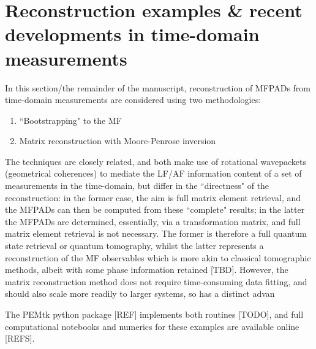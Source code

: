 \section{Reconstruction examples \& recent developments in time-domain measurements}

In this section/the remainder of the manuscript, reconstruction of MFPADs from time-domain measurements are considered using two methodologies:

\begin{enumerate}
\item ``Bootstrapping" to the MF \cite{hockett2018QMP1,hockett2018QMP2,marceau2017MolecularFrameReconstruction}
\item Matrix reconstruction with Moore-Penrose inversion \cite{gregory2021MolecularFramePhotoelectron}
\end{enumerate}

The techniques are closely related, and both make use of rotational wavepackets (geometrical coherences) to mediate the LF/AF information content of a set of measurements in the time-domain, but differ in the ``directness" of the reconstruction: in the former case, the aim is full matrix element retrieval, and the MFPADs can then be computed from these ``complete" results; in the latter the MFPADs are determined, essentially, via a transformation matrix, and full matrix element retrieval is not necessary. The former is therefore a full quantum state retrieval or quantum tomography, whilst the latter represents a reconstruction of the MF observables which is more akin to classical tomographic methods, albeit with some phase information retained [TBD]. However, the matrix reconstruction method does not require time-consuming data fitting, and should also scale more readily to larger systems, so has a distinct advan

The PEMtk python package [REF] implements both routines [TODO], and full computational notebooks and numerics for these examples are available online [REFS].